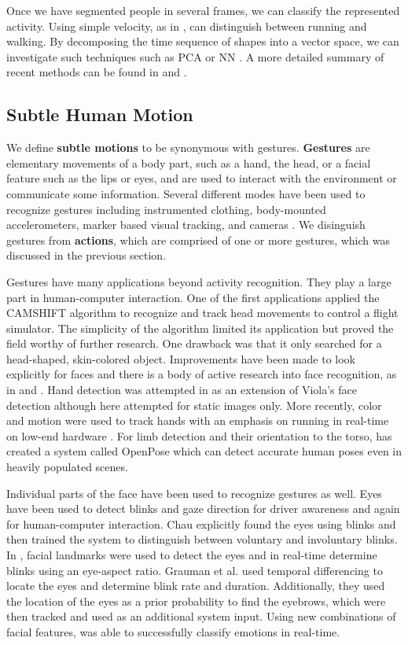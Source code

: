 \documentclass[11pt]{article}
\begin{document}
Once we have segmented people in several frames, we can classify the represented activity. Using simple velocity, as in \cite{bodor2003}, can distinguish between running and walking. By decomposing the time sequence of shapes into a vector space, we can investigate such techniques such as PCA \cite{masoud2003} or NN \cite{blank2005}. A more detailed summary of recent methods can be found in \cite{poppe2010} and \cite{aggarwal2011}.

\subsection{Subtle Human Motion}
We define \textbf{subtle motions} to be synonymous with gestures. \textbf{Gestures} are elementary movements of a body part, such as a hand, the head, or a facial feature such as the lips or eyes, and are used to interact with the environment or communicate some information. Several different modes have been used to recognize gestures including instrumented clothing, body-mounted accelerometers, marker based visual tracking, and cameras \cite{mitra2007}. We disinguish gestures from \textbf{actions}, which are comprised of one or more gestures, which was discussed in the previous section.

Gestures have many applications beyond activity recognition. They play a large part in human-computer interaction. One of the first applications \cite{bradski98} applied the CAMSHIFT algorithm to recognize and track head movements to control a flight simulator. The simplicity of the algorithm limited its application but proved the field worthy of further research. One drawback  was that it \cite{bradski98} only searched for a head-shaped, skin-colored object. Improvements have been made to look explicitly for faces and there is a body of active research into face recognition, as in \cite{cech2014} and \cite{viola2004}. Hand detection was attempted in \cite{kolsch2004} as an extension of Viola's face detection although here attempted for static images only. More recently, color and motion were used to track hands with an emphasis on running in real-time on low-end hardware \cite{liu2017}. For limb detection and their orientation to the torso, \cite{cao2016} has created a system called OpenPose which can detect accurate human poses even in heavily populated scenes.

Individual parts of the face have been used to recognize gestures as well. Eyes have been used to detect blinks and gaze direction for driver awareness and again for human-computer interaction. Chau \cite{chau2005} explicitly found the eyes using blinks and then trained the system to distinguish between voluntary and involuntary blinks. In \cite{soukupova2016}, facial landmarks were used to detect the eyes and in real-time determine blinks using an eye-aspect ratio. Grauman et al. \cite{grauman2003} used temporal differencing to locate the eyes and determine blink rate and duration. Additionally, they used the location of the eyes as a prior probability to find the eyebrows, which were then tracked and used as an additional system input. Using new combinations of facial features, \cite{nguyen2017} was able to successfully classify emotions in real-time.
\end{document}
